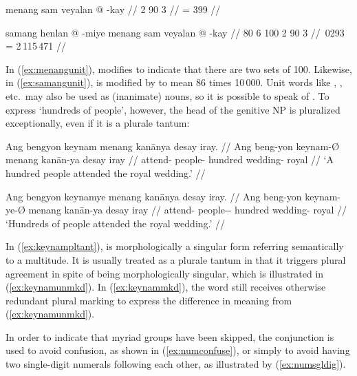 \pex[glwordalign=center]
\a\label{ex:menangunit}\begingl
	\gla menang sam veyalan @ -kay //
	 {2} {90} {3} //
	 = 399 //
\endgl

\a\label{ex:samangunit}\begingl
	\gla samang henlan @ -miye menang sam veyalan @ -kay //
	 {80} {6} {100} {2} {90} {3} //
	\,0293 = 2\,115\,471 //
\endgl

\xe

In (\ref{ex:menangunit}),  modifies  to 
indicate that there are two sets of 100. Likewise, in 
(\ref{ex:samangunit}),  is modified by 
 to mean 86 times 10\,000.
Unit words like , , etc.\ may also be 
used as (inanimate) nouns, so it is possible to speak of  
. To express `hundreds of people', however, 
the head of the genitive NP is pluralized exceptionally, even if it is a 
plurale tantum:

\pex\label{ex:keynampltant}
\a\label{ex:keynamunmkd}\begingl
	\gla Ang bengyon keynam menang kanānya {desay iray}. //
	\glb Ang beng-yon keynam-Ø menang kanān-ya {desay iray} //
	\glc \AgtT{} attend-\TplN{} people-\Top{} hundred wedding-\Loc{} 
		royal //
	\glft `A hundred people attended the royal wedding.' //
\endgl

\a\label{ex:keynammkd}\begingl
	\gla Ang bengyon keynamye menang kanānya {desay iray}. //
	\glb Ang beng-yon keynam-ye-Ø menang kanān-ya {desay iray} //
	\glc \AgtT{} attend-\TplN{} people-\Pl{}-\Top{} hundred wedding-\Loc{} 
		royal //
	\glft `Hundreds of people attended the royal wedding.' //
\endgl

\xe

In (\ref{ex:keynampltant}),  is morphologically a singular
form referring semantically to a multitude. It is usually treated as a plurale
tantum in that it triggers plural agreement in spite of being morphologically
singular, which is illustrated in (\ref{ex:keynamunmkd}). In
(\ref{ex:keynammkd}), the word still receives otherwise redundant plural
marking to express the difference in meaning from (\ref{ex:keynamunmkd}).

In order to indicate that myriad groups have been skipped, the conjunction
 is used to avoid confusion, as shown in
(\ref{ex:numconfuse}), or simply to avoid having two single-digit numerals
following each other, as illustrated by (\ref{ex:numsgldig}).

